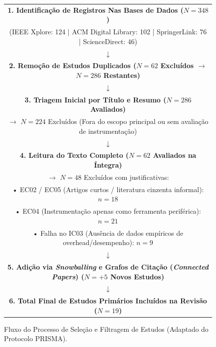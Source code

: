 \documentclass[sigconf, anonymous]{acmart}
\begin{document}
\begin{figure}[htbp]
\centering
\begin{tabular}{|c|}
\hline
\textbf{1. Identificação de Registros Nas Bases de Dados ($N = 348$)} \\
\small (IEEE Xplore: 124 | ACM Digital Library: 102 | SpringerLink: 76 | ScienceDirect: 46) \\
\hline
$\downarrow$ \\
\hline
\textbf{2. Remoção de Estudos Duplicados ($N = 62$ Excluídos $\rightarrow$ $N = 286$ Restantes)} \\
\hline
$\downarrow$ \\
\hline
\textbf{3. Triagem Inicial por Título e Resumo ($N = 286$ Avaliados)} \\
\small $\rightarrow$ $N = 224$ Excluídos (Fora do escopo principal ou sem avaliação de instrumentação) \\
\hline
$\downarrow$ \\
\hline
\textbf{4. Leitura do Texto Completo ($N = 62$ Avaliados na Íntegra)} \\
\small $\rightarrow$ $N = 48$ Excluídos com justificativas: \\
\small • EC02 / EC05 (Artigos curtos / literatura cinzenta informal): $n = 18$ \\
\small • EC04 (Instrumentação apenas como ferramenta periférica): $n = 21$ \\
\small • Falha no IC03 (Ausência de dados empíricos de overhead/desempenho): $n = 9$ \\
\hline
$\downarrow$ \\
\hline
\textbf{5. Adição via \textit{Snowballing} e Grafos de Citação (\textit{Connected Papers}) ($N = +5$ Novos Estudos)} \\
\hline
$\downarrow$ \\
\hline
\textbf{6. Total Final de Estudos Primários Incluídos na Revisão ($N = 19$)} \\
\hline
\end{tabular}
\caption{Fluxo do Processo de Seleção e Filtragem de Estudos (Adaptado do Protocolo PRISMA).}
\label{fig:prisma_flow}
\end{figure}
\end{document}
